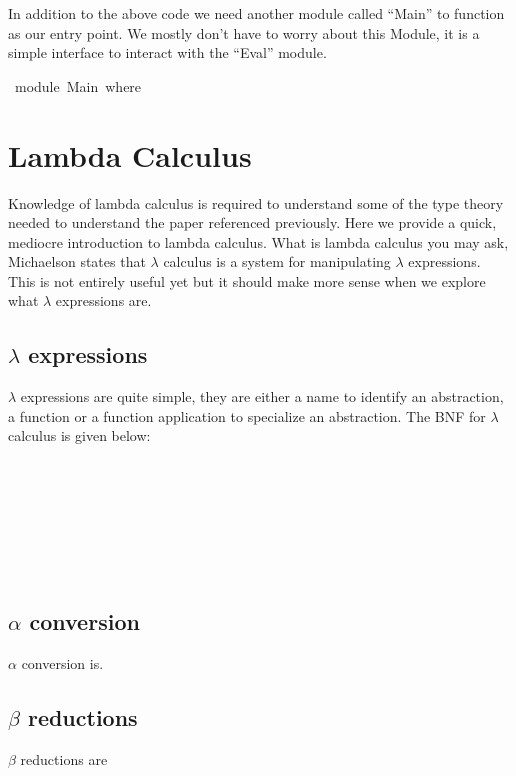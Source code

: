 \documentclass[a4paper,11pt]{article}
\begin{document}
In addition to the above code we need another module called ``Main'' to function as our entry point. We mostly don't have to worry about this Module, it is a simple interface to 
interact with the ``Eval'' module. 
\begin{tabbing}\ttfamily
~module~Main~where
\end{tabbing}

\section{Lambda Calculus}
Knowledge of lambda calculus is required to understand some of the type theory needed to understand the paper referenced previously. Here we 
provide a quick, mediocre introduction to lambda calculus. What is lambda calculus you may ask, Michaelson states that $\lambda$ calculus is a system for manipulating $\lambda$ expressions.
This is not entirely useful yet but it should make more sense when we explore what $\lambda$ expressions are. 

\subsection{$\lambda$ expressions}
$\lambda$ expressions are quite simple, they are either a name to identify an abstraction, a function or a function application to specialize an abstraction. 
The BNF for $\lambda$ calculus is given below:
\begin{bnf*}
   \bnfor {} \bnfor {} \\
   \bnfsk {} \\ 
  \bnfts{$\lambda$}   \\
   \\ 
  \bnfts{(}  \ \  \bnfts{)} \\
   \\
\end{bnf*}

\subsection{$\alpha$ conversion}
$\alpha$ conversion is. 

\subsection{$\beta$ reductions}
$\beta$ reductions are 
\end{document}
